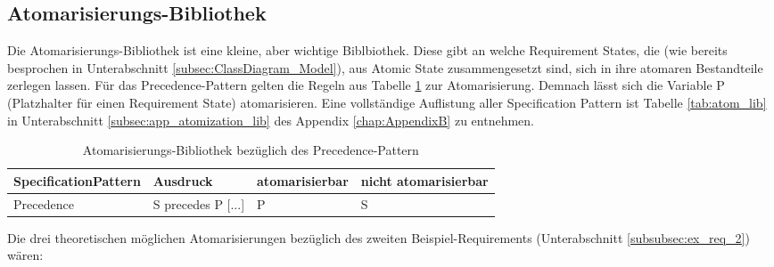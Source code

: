 \subsection{Atomarisierungs-Bibliothek}
\label{subsec:atomization_lib}
Die Atomarisierungs-Bibliothek ist eine kleine, aber wichtige Biblbiothek. Diese gibt an welche Requirement States, die (wie bereits besprochen in Unterabschnitt \ref{subsec:ClassDiagram_Model}), aus Atomic State zusammengesetzt sind, sich in ihre atomaren Bestandteile zerlegen lassen. Für das Precedence-Pattern gelten die Regeln aus Tabelle \ref{tab:atom_precedence} zur Atomarisierung. Demnach lässt sich die Variable P (Platzhalter für einen Requirement State) atomarisieren. Eine vollständige Auflistung aller Specification Pattern ist Tabelle \ref{tab:atom_lib} in Unterabschnitt \ref{subsec:app_atomization_lib} des Appendix \ref{chap:AppendixB} zu entnehmen.\\
\begin{table}[H]
	\centering
	\begin{tabularx}{\textwidth}{p{}|p{}|p{}|p{}}
		\hline
		Specification\newline Pattern & Ausdruck & atomarisierbar & nicht \newline atomarisierbar \\ \hline
		Precedence & S precedes P [...] & P & S \\ 
	\end{tabularx}
	\caption{Atomarisierungs-Bibliothek bezüglich des Precedence-Pattern}
	\label{tab:atom_precedence}
\end{table}
Die drei theoretischen möglichen Atomarisierungen bezüglich des zweiten Beispiel-Requirements (Unterabschnitt \ref{subsubsec:ex_req_2}) wären:
